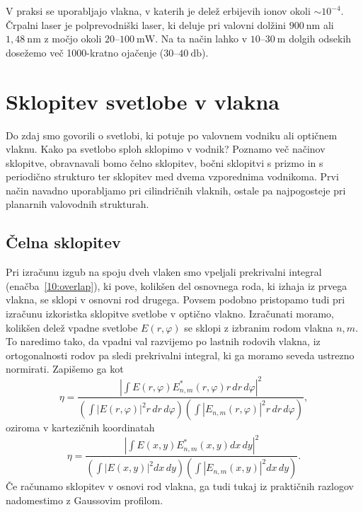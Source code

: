 V praksi se uporabljajo vlakna, v katerih je delež erbijevih ionov okoli $\sim 10^{-4}$. 
Črpalni laser je polprevodniški laser, ki 
deluje pri valovni dolžini $900~\si{\nano\meter}$ ali $1,48~\si{\nano\meter}$ 
z močjo okoli $20$--$100~\si{\milli\watt}$. Na ta način lahko v $10$--$30~\si{\meter}$
dolgih odsekih dosežemo več 1000-kratno ojačenje ($30$--$40~\si{\decibel}$).

\section{Sklopitev svetlobe v vlakna}
Do zdaj smo govorili o svetlobi, ki potuje po valovnem vodniku ali optičnem vlaknu. Kako pa 
svetlobo sploh sklopimo v vodnik? Poznamo več načinov sklopitve, obravnavali bomo 
čelno sklopitev, bočni sklopitvi s prizmo in s periodično strukturo ter  
sklopitev med dvema vzporednima vodnikoma. Prvi način navadno uporabljamo pri 
cilindričnih vlaknih, ostale pa najpogosteje pri planarnih valovodnih strukturah.

\subsection*{Čelna sklopitev}
Pri izračunu izgub na spoju dveh vlaken smo vpeljali prekrivalni integral (enačba~\ref{10:overlap}), 
ki pove, kolikšen del osnovnega roda, ki izhaja iz prvega vlakna, se sklopi v osnovni 
rod drugega. Povsem podobno pristopamo tudi pri izračunu izkoristka sklopitve svetlobe v optično vlakno.
Izračunati moramo, kolikšen delež vpadne svetlobe $E(r, \varphi)$ se sklopi z izbranim rodom 
vlakna $n,m$. To naredimo tako, da vpadni val razvijemo po lastnih rodovih vlakna, iz ortogonalnosti
rodov pa sledi prekrivalni integral, ki ga moramo seveda ustrezno normirati. Zapišemo ga kot
\begin{equation}
\eta = \frac{|\int E(r, \varphi) E^*_{n,m}(r, \varphi) r\, dr\, d\varphi|^2}
{\left(\int |E(r, \varphi)|^2 r\, dr\, d\varphi \right) \left(\int |E_{n,m}(r, \varphi)|^2 
r\, dr\, d\varphi \right)},
\end{equation}
oziroma v kartezičnih koordinatah
\begin{equation}
\eta = \frac{|\int E(x,y) E^*_{n,m}(x,y) dx\, dy|^2}
{\left(\int |E(x, y)|^2 dx\,dy \right) \left(\int |E_{n,m}(x, y)|^2 
dx\, dy \right)}.
\end{equation}
Če računamo sklopitev v osnovi rod vlakna, ga tudi tukaj iz praktičnih razlogov nadomestimo 
z Gaussovim profilom.

